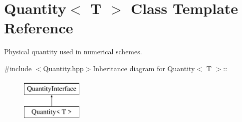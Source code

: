 \hypertarget{classQuantity}{
\section{Quantity$<$ T $>$ Class Template Reference}
\label{classQuantity}
}


Physical quantity used in numerical schemes.  


{\ttfamily \#include $<$Quantity.hpp$>$}Inheritance diagram for Quantity$<$ T $>$::\begin{figure}[H]
\begin{center}
\leavevmode
\includegraphics[height=2cm]{classQuantity}
\end{center}
\end{figure}
